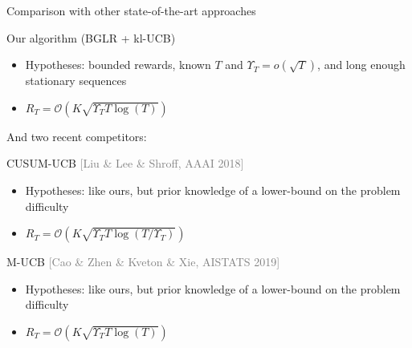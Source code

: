 \documentclass[11pt,english,ignorenonframetext,]{beamer}
\begin{document}
\begin{frame}{Comparison with other state-of-the-art approaches}

  \begin{block}{Our algorithm (BGLR + kl-UCB)}
    \begin{itemize}
      \item Hypotheses: bounded rewards, known $T$ and $\Upsilon_T = o(\sqrt{T})$, and long enough stationary sequences
      \item $R_T = \mathcal{O}(K \sqrt{\Upsilon_T T \log(T)})$
    \end{itemize}
  \end{block}

  And two recent competitors:


  \begin{block}{CUSUM-UCB \hfill{} \textcolor{gray}{[Liu \& Lee \& Shroff, AAAI 2018]}}
    \begin{itemize}
      \item Hypotheses: like ours, \alert{but prior knowledge of a lower-bound on the problem difficulty}
      \item $R_T = \mathcal{O}(K \sqrt{\Upsilon_T T \log(T / \Upsilon_T)})$
    \end{itemize}
  \end{block}

  \begin{block}{M-UCB \hfill{} \textcolor{gray}{[Cao \& Zhen \& Kveton \& Xie, AISTATS 2019]}}
    \begin{itemize}
      \item Hypotheses: like ours, \alert{but prior knowledge of a lower-bound on the problem difficulty}
      \item $R_T = \mathcal{O}(K \sqrt{\Upsilon_T T \log(T)})$
    \end{itemize}
  \end{block}

\end{frame}
\end{document}
